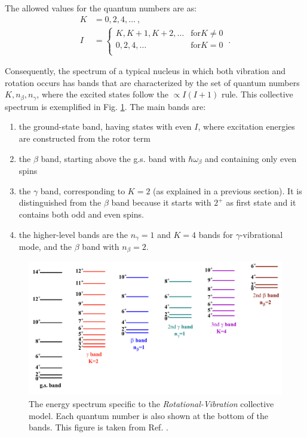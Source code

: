 The allowed values for the quantum numbers are as:
\begin{align}
    K&=0,2,4,\dots\ ,\nonumber\\
    I&=\begin{cases}
        K,K+1,K+2,\dots &\text{for} K\neq 0\\
        0,2,4,\dots &\text{for} K=0\\
   \end{cases}\ .
\end{align}

Consequently, the spectrum of a typical nucleus in which both vibration and rotation occurs has bands that are characterized by the set of quantum numbers $K,n_\beta,n_\gamma$, where the excited states follow the $\propto I(I+1)$ rule. This collective spectrum is exemplified in Fig. \ref{collective-rotation-vibration-energy-levels}. The main bands are:
\begin{enumerate}
    \item the ground-state band, having states with even $I$, where excitation energies are constructed from the rotor term
    \item the $\beta$ band, starting above the g.s. band with $\hbar\omega_\beta$ and containing only even spins
    \item the $\gamma$ band, corresponding to $K=2$ (as explained in a previous section). It is distinguished from the $\beta$ band because it starts with $2^+$ as first state and it contains both odd and even spins.
    \item the higher-level bands are the $n_\gamma=1$ and $K=4$ bands for $\gamma$-vibrational mode, and the $\beta$ band with $n_\beta=2$.
\end{enumerate}

\begin{figure}
    \centering
    \includegraphics[scale=0.29]{Chapters/Figures/types_collective_bands.pdf}
    \caption{The energy spectrum specific to the \emph{Rotational-Vibration} collective model. Each quantum number is also shown at the bottom of the bands. This figure is taken from Ref. \cite{li2022model}.}
    \label{collective-rotation-vibration-energy-levels}
\end{figure}


